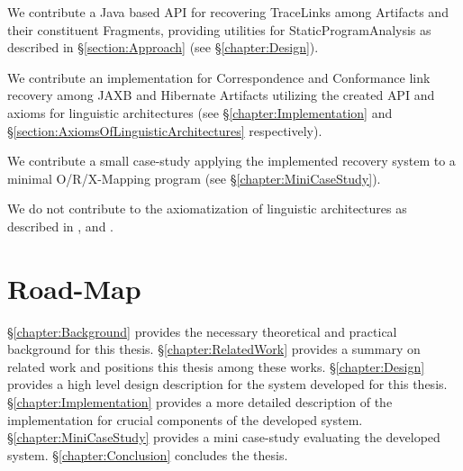 \begin{contributions}

\item
We contribute a \gls{Java} based \gls{API} for recovering \glspl{TraceLink} among \glspl{Artifact} and their constituent \glspl{Fragment}, providing utilities for \gls{StaticProgramAnalysis} as described in §\ref{section:Approach} (see §\ref{chapter:Design}).

\item
We contribute an implementation for \gls{Correspondence} and \gls{Conformance} link recovery among \gls{JAXB} and \gls{Hibernate} \glspl{Artifact} utilizing the created \gls{API} and axioms for linguistic architectures (see §\ref{chapter:Implementation} and §\ref{section:AxiomsOfLinguisticArchitectures} respectively).

\item
We contribute a small case-study applying the implemented recovery system to a minimal \gls{O/R/X-Mapping} program (see §\ref{chapter:MiniCaseStudy}).

\end{contributions}

\begin{noncontributions}

\item
We do not contribute to the axiomatization of linguistic architectures as described in \cite{DBLP:conf/ecmdafa/LammelV14}, \cite{DBLP:conf/sle/Lammel16} and \cite{DBLP:conf/modelsward/HeinzLV17}.

\end{noncontributions}

\section{Road-Map}
§\ref{chapter:Background} provides the necessary theoretical and practical background for this thesis.
§\ref{chapter:RelatedWork} provides a summary on related work and positions this thesis among these works.
§\ref{chapter:Design} provides a high level design description for the system developed for this thesis.
§\ref{chapter:Implementation} provides a more detailed description of the implementation for crucial components of the developed system.
§\ref{chapter:MiniCaseStudy} provides a mini case-study evaluating the developed system.
§\ref{chapter:Conclusion} concludes the thesis.
